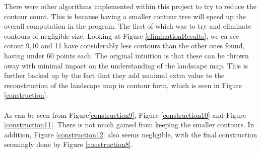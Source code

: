 \documentclass[11pt]{article}
\begin{document}
There were other algorithms implemented within this project to try to reduce the
contour count. This is because having a smaller contour tree will speed
up the overall computation in the program. The first of which was to try and
eliminate contours of negligible size. Looking at Figure \ref{eliminationResults},
we ca see cotour 9,10 and 11 have considerably less contours than the
other ones found, having under 60 points each. The original intuition is that
these can be thrown away with minimal impact on the understanding of the
landscape map. This is further backed up by the fact that they add
minimal extra value to the reconstruction of the landscape map in contour form,
which is seen in Figure \ref{construction}.\\
\\
As can be seen from Figure\ref{construction9}, Figure \ref{construction10} and
Figure \ref{construction11}. There is not much gained from keeping the smaller
contours. In addition, Figure \ref{construction12} also seems negligible, with
the final construction seemingly done by Figure \ref{construction8}. 
\end{document}
